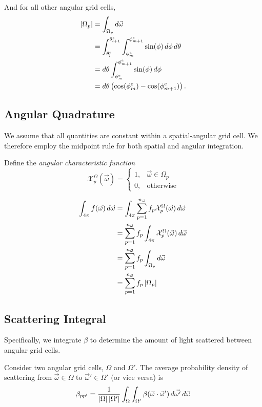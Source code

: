 And for all other angular grid cells,
\begin{align}
  \left| \Omega_p \right| &= \int_{\Omega_p} d{\vec{\omega}} \\
                 &= \int_{\theta_l^e}^{\theta_{l+1}^e}\int_{\phi_m^e}^{\phi_{m+1}^e} \sin(\phi)\, d\phi\, d\theta \\
                 &= d\theta \int_{\phi_m^e}^{\phi_{m+1}^e} \sin(\phi)\, d\phi \\
                 &= d\theta\left( \cos(\phi_m^e)-\cos(\phi_{m+1}^e) \right).
\end{align}


\subsection{Angular Quadrature}
We assume that all quantities are constant within a spatial-angular grid cell.
We therefore employ the midpoint rule for both spatial and angular integration.

Define the \textit{angular characteristic function}
\begin{equation}
  \mathcal{X}^\Omega_p(\vec{\omega}) = \begin{cases}
    1, & \vec{\omega} \in \Omega_p \\
    0, & \mbox{otherwise}
  \end{cases}
\end{equation}

\begin{align}
  \int_{4\pi} f(\vec{\omega})\, d\vec{\omega} &= \int_{4\pi} \sum_{p=1}^{n_{\vec{\omega}}} f_p \mathcal{X}^\Omega_p(\vec{\omega})\, d\vec{\omega} \\
  &= \sum_{p=1}^{n_{\vec{\omega}}} f_p \int_{4\pi} \mathcal{X}^\Omega_p(\vec{\omega})\, d\vec{\omega} \\
  &= \sum_{p=1}^{n_{\vec{\omega}}} f_p \int_{\Omega_p} d\vec{\omega} \\
  &= \sum_{p=1}^{n_{\vec{\omega}}} f_p \left| \Omega_p \right|
\end{align}

 \subsection{Scattering Integral}

Specifically, we integrate $\beta$ to determine the amount of light scattered between angular grid cells.

Consider two angular grid cells, $\Omega$ and $\Omega'$.
The average probability density of scattering from $\vec{\omega} \in \Omega$ to $\vec{\omega}' \in \Omega'$ (or vice versa) is
\begin{equation}
  \beta_{pp'} = \frac{1}{\left| \Omega \right|\left| \Omega' \right|} \int_\Omega\int_{\Omega'}\beta(\vec{\omega}\cdot\vec{\omega}')\, d\vec{\omega'}\, d\vec{\omega}
\end{equation}

